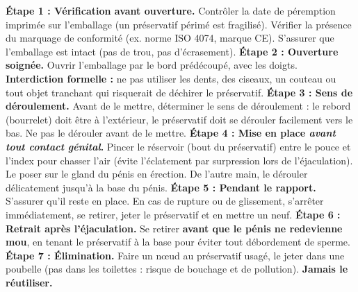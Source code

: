\documentclass[11pt]{article}
\begin{document}
\begin{methode}
\textbf{Étape 1 : Vérification avant ouverture.} Contrôler la date de péremption imprimée sur l'emballage (un préservatif périmé est fragilisé). Vérifier la présence du marquage de conformité (ex. norme ISO 4074, marque CE). S'assurer que l'emballage est intact (pas de trou, pas d'écrasement).
\textbf{Étape 2 : Ouverture soignée.} Ouvrir l'emballage par le bord prédécoupé, avec les doigts. \textbf{Interdiction formelle :} ne pas utiliser les dents, des ciseaux, un couteau ou tout objet tranchant qui risquerait de déchirer le préservatif.
\textbf{Étape 3 : Sens de déroulement.} Avant de le mettre, déterminer le sens de déroulement : le rebord (bourrelet) doit être à l'extérieur, le préservatif doit se dérouler facilement vers le bas. Ne pas le dérouler avant de le mettre.
\textbf{Étape 4 : Mise en place \emph{avant tout contact génital}.} Pincer le réservoir (bout du préservatif) entre le pouce et l'index pour chasser l'air (évite l'éclatement par surpression lors de l'éjaculation). Le poser sur le gland du pénis en érection. De l'autre main, le dérouler délicatement jusqu'à la base du pénis.
\textbf{Étape 5 : Pendant le rapport.} S'assurer qu'il reste en place. En cas de rupture ou de glissement, s'arrêter immédiatement, se retirer, jeter le préservatif et en mettre un neuf.
\textbf{Étape 6 : Retrait après l'éjaculation.} Se retirer \textbf{avant que le pénis ne redevienne mou}, en tenant le préservatif à la base pour éviter tout débordement de sperme.
\textbf{Étape 7 : Élimination.} Faire un nœud au préservatif usagé, le jeter dans une poubelle (pas dans les toilettes : risque de bouchage et de pollution). \textbf{Jamais le réutiliser.}
\end{methode}
\end{document}
